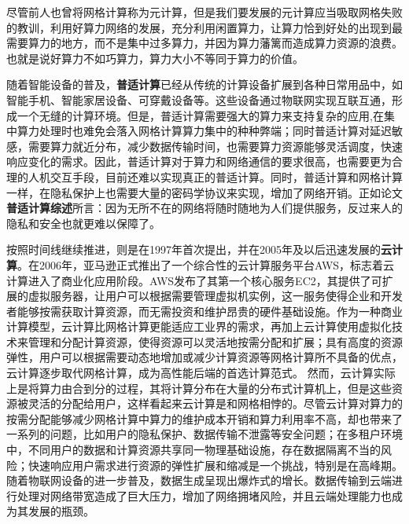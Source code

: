 \documentclass[a4paper,twoside]{scrbook}
\begin{document}
尽管前人也曾将网格计算称为元计算，但是我们要发展的元计算应当吸取网格失败的教训，利用好算力网络的发展，充分利用闲置算力，让算力恰到好处的出现到最需要算力的地方，而不是集中过多算力，并因为算力藩篱而造成算力资源的浪费。也就是说好算力不如巧算力，算力大小不等同于算力的价值。

随着智能设备的普及，\textbf{普适计算}已经从传统的计算设备扩展到各种日常用品中，如智能手机、智能家居设备、可穿戴设备等。这些设备通过物联网实现互联互通，形成一个无缝的计算环境。但是，普适计算需要强大的算力来支持复杂的应用,在集中算力处理时也难免会落入网格计算算力集中的种种弊端；同时普适计算对延迟敏感，需要算力就近分布，减少数据传输时间，也需要算力资源能够灵活调度，快速响应变化的需求。因此，普适计算对于算力和网络通信的要求很高，也需要更为合理的人机交互手段，目前还难以实现真正的普适计算。同时，普适计算和网格计算一样，在隐私保护上也需要大量的密码学协议来实现，增加了网络开销。正如论文\textbf{普适计算综述}所言：因为无所不在的网络将随时随地为人们提供服务，反过来人的隐私和安全也就更难以保障了。

按照时间线继续推进，则是在1997年首次提出，并在2005年及以后迅速发展的\textbf{云计算}。在2006年，亚马逊正式推出了一个综合性的云计算服务平台AWS，标志着云计算进入了商业化应用阶段。AWS发布了其第一个核心服务EC2，其提供了可扩展的虚拟服务器，让用户可以根据需要管理虚拟机实例，这一服务使得企业和开发者能够按需获取计算资源，而无需投资和维护昂贵的硬件基础设施。作为一种商业计算模型，云计算比网格计算更能适应工业界的需求，再加上云计算使用虚拟化技术来管理和分配计算资源，使得资源可以灵活地按需分配和扩展；具有高度的资源弹性，用户可以根据需要动态地增加或减少计算资源等网格计算所不具备的优点，云计算逐步取代网格计算，成为高性能后端的首选计算范式。
然而，云计算实际上是将算力由合到分的过程，其将计算分布在大量的分布式计算机上，但是这些资源被灵活的分配给用户，这样看起来云计算是和网格相悖的。尽管云计算对算力的按需分配能够减少网格计算中算力的维护成本开销和算力利用率不高，却也带来了一系列的问题，比如用户的隐私保护、数据传输不泄露等安全问题；在多租户环境中，不同用户的数据和计算资源共享同一物理基础设施，存在数据隔离不当的风险；快速响应用户需求进行资源的弹性扩展和缩减是一个挑战，特别是在高峰期。随着物联网设备的进一步普及，数据生成呈现出爆炸式的增长。数据传输到云端进行处理对网络带宽造成了巨大压力，增加了网络拥堵风险，并且云端处理能力也成为其发展的瓶颈。
\end{document}

